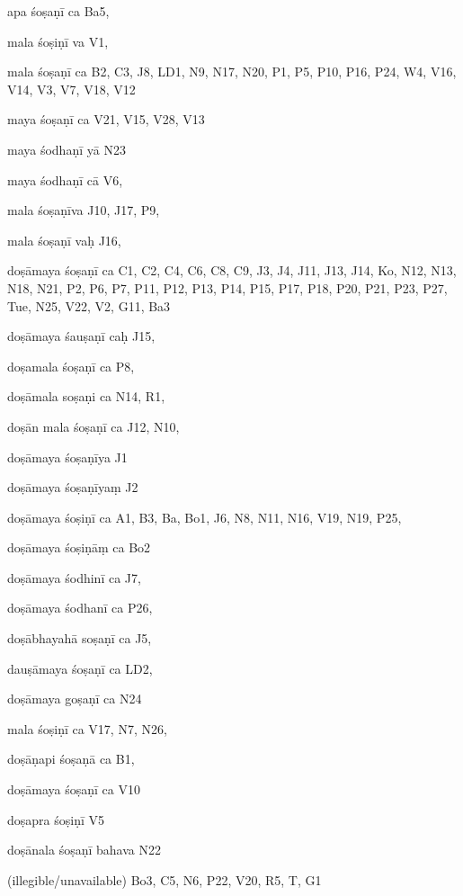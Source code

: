\begin{ekdosis}
\begin{marma}[hp01_055]
\begin{marma}[hp02_009]
\begin{marma}[hp02_011]
 \begin{marma}[hp02_35c]
\item[apa śoṣaṇī ca] Ba5,
\item[mala śoṣiṇī va] V1,
\item[mala śoṣaṇī ca] B2, C3, J8, LD1, N9, N17, N20, P1, P5, P10, P16, P24, W4, V16, V14, V3, V7, V18, V12
\item[maya śoṣaṇī ca] V21, V15, V28, V13
\item[maya śodhaṇī yā] N23
\item[maya śodhaṇī cā] V6, 
\item[mala śoṣaṇīva] J10, J17, P9,
\item[mala śoṣaṇī vaḥ] J16,
\item[doṣāmaya śoṣaṇī ca] C1, C2, C4, C6, C8, C9, J3, J4, J11, J13, J14, Ko, N12, N13, N18, N21, P2, P6, P7, P11, P12, P13, P14, P15, P17, P18, P20, P21, P23, P27, Tue, N25, V22, V2, G11, Ba3
\item[doṣāmaya śauṣaṇī caḥ] J15, 
\item[doṣamala śoṣaṇī ca] P8,  
\item[doṣāmala soṣaṇi ca] N14, R1,  
\item[doṣān mala śoṣaṇī ca] J12, N10, 
\item[doṣāmaya śoṣaṇīya] J1
\item[doṣāmaya śoṣaṇīyaṃ] J2
\item[doṣāmaya śoṣiṇī ca] A1, B3, Ba, Bo1, J6, N8, N11, N16, V19, N19, P25, 
\item[doṣāmaya śoṣiṇāṃ ca] Bo2
\item[doṣāmaya śodhinī ca] J7, 
\item[doṣāmaya śodhanī ca] P26,
\item[doṣābhayahā soṣaṇī ca] J5,
\item[dauṣāmaya śoṣaṇī ca] LD2,
\item[doṣāmaya goṣaṇī ca] N24
\item[mala śoṣiṇī ca] V17, N7, N26,
\item[doṣāṇapi śoṣaṇā ca] B1,
\item[doṣāmaya śoṣaṇī ca] V10
\item[doṣapra śoṣiṇī] V5
\item[doṣānala śoṣaṇī bahava] N22
\item[(illegible/unavailable)] Bo3, C5, N6, P22, V20, R5, T, G1
  \begin{description}

    \end{description}
 \end{marma}


\end{marma}
\end{marma}
\end{marma}
\end{ekdosis}
